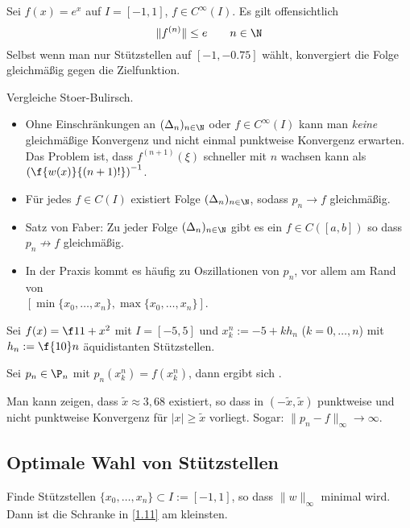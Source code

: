 \documentclass[11pt]{scrbook}
\begin{document}
\begin{ex*}
	Sei $f(x)=e^x$ auf $I=[-1,1]$, $f\in C^\infty(I)$.
	Es gilt offensichtlich
	\[
		\|f^{(n)}\| \le e \qquad n\in \N
	\]
	Selbst wenn man nur Stützstellen auf $[-1,-0.75]$ wählt, konvergiert die Folge gleichmäßig gegen die Zielfunktion.
\end{ex*}

\begin{note}
	Vergleiche Stoer-Bulirsch.
	\begin{itemize}
		\item
			Ohne Einschränkungen an $(\Delta_n)_{n\in \N}$ oder $f\in C^\infty(I)$ kann man \emph{keine} gleichmäßige Konvergenz und nicht einmal punktweise Konvergenz erwarten.
			Das Problem ist, dass $f^{(n+1)}(\xi)$ schneller mit $n$ wachsen kann als $\left(\f {w(x)}{(n+1)!}\right)^{-1}$.	
		\item
			Für jedes $f\in C(I)$ existiert Folge $(\Delta_n)_{n\in \N}$, sodass $p_n\to f$ gleichmäßig.
		\item
			Satz von Faber: Zu jeder Folge $(\Delta_n)_{n\in \N}$ gibt es ein $f\in C([a,b])$ so dass $p_n\not\to f$ gleichmäßig.
		\item
			In der Praxis kommt es häufig zu Oszillationen von $p_n$, vor allem am Rand von\\ $[ \min\{x_0,\dotsc, x_n\},\max\{x_0,\dotsc,x_n\} ]$.
	\end{itemize}
\end{note}

\begin{ex*}[Runge]
	Sei $f(x)= \f 1{1+x^2}$ mit $I=[-5,5]$ und $x_k^n := -5+k h_n$ ($k=0,\dotsc,n$) mit $h_n:= \f {10}n$ äquidistanten Stützstellen.

	Sei $p_n\in \P_n$ mit $p_n(x_k^n) = f(x_k^n)$, dann ergibt sich \fixme[Oszillationen].
	
	Man kann zeigen, dass $\tilde x \approx 3,68$ existiert, so dass in $(-\tilde x,\tilde x)$ punktweise und nicht punktweise Konvergenz für $|x|\ge \tilde x$ vorliegt. Sogar: $\|p_n-f\|_\infty \to \infty$.
\end{ex*}

\subsection{Optimale Wahl von Stützstellen}

Finde Stützstellen $\{x_0,\dotsc,x_n\}\subset I := [-1,1]$, so dass $\|w\|_\infty$ minimal wird.
Dann ist die Schranke in \ref{1.11} am kleinsten.
\end{document}
